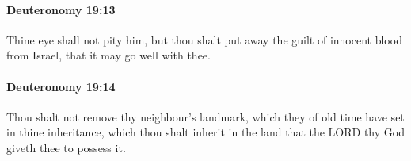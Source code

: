 		\paragraph{Deuteronomy 19:13} %
			\label{DEUTERONOMY-19-13}

			Thine eye shall not pity him, but thou shalt put away the guilt of innocent blood from Israel, that it may go well with thee.


		\paragraph{Deuteronomy 19:14} %
			\label{DEUTERONOMY-19-14}

			Thou shalt not remove thy neighbour's landmark, which they of old time have set in thine inheritance, which thou shalt inherit in the land that the LORD thy God giveth thee to possess it.


